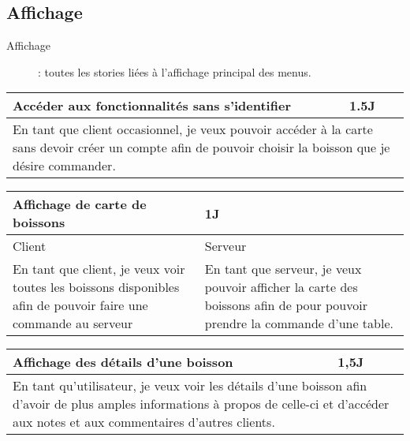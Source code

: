 \subsection{Affichage}
\begin{description}
	\item[Affichage] : toutes les stories liées à l'affichage principal des menus.
\end{description}

\begin{center}
	\begin{tabular}{ll}
		\hline
			\multicolumn{1}{|p{14cm}|}{Accéder aux fonctionnalités sans s’identifier} & \multicolumn{1}{p{0.7cm}|}{1.5J} \\ 
		\hline
			\multicolumn{2}{|p{15cm}|}{En tant que client occasionnel, je veux pouvoir
			accéder à la carte sans devoir créer un compte afin de pouvoir choisir
			la boisson que je désire commander.} \\
		\hline
	\end{tabular}

	\vspace{1cm}
	
	\begin{tabular}{lll}
		\hline
			\multicolumn{2}{|p{14cm}}{Affichage de carte de boissons } & \multicolumn{1}{|p{0.7cm}|}{1J} \\
		\hline
			\multicolumn{1}{|p{7cm}}{Client} & \multicolumn{2}{|p{7cm}|}{Serveur} \\ 
		\hline
			\multicolumn{1}{|p{7cm}}{En tant que client, je veux voir toutes les boissons disponibles 
			afin de pouvoir faire une commande au serveur } & \multicolumn{2}{|p{7cm}|}{En tant que 
			serveur, je veux pouvoir afficher la carte des boissons afin de pour pouvoir prendre la commande d'une table.} \\ 
		\hline
	\end{tabular}

	\vspace{1cm}
	
	\begin{tabular}{ll}
		\hline
			\multicolumn{1}{|p{14cm}|}{Affichage des détails d'une boisson} & \multicolumn{1}{p{0.7cm}|}{1,5J}\\ 
		\hline
			\multicolumn{2}{|p{15cm}|}{En tant qu'utilisateur, je veux voir les détails d'une 
			boisson afin d'avoir de plus amples informations à propos de celle-ci et d'accéder 
			aux notes et aux commentaires d'autres clients.}\\
		\hline
	\end{tabular}
\end{center}

